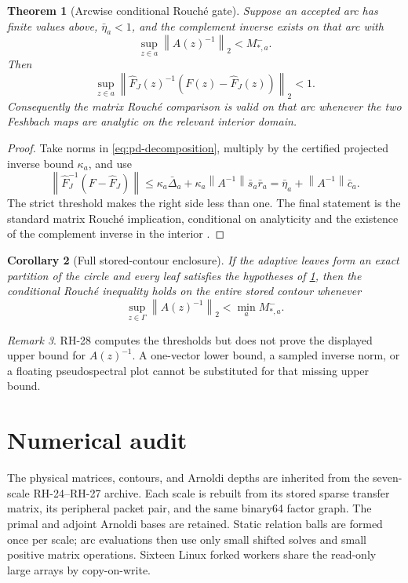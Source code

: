 \documentclass[11pt]{article}
\newtheorem{theorem}{Theorem}[section]
\newtheorem{corollary}[theorem]{Corollary}
\theoremstyle{definition}
\theoremstyle{remark}
\newtheorem{remark}[theorem]{Remark}
\newcommand{\norm}[1]{\left\lVert#1\right\rVert}
\begin{document}
\begin{theorem}[Arcwise conditional Rouché gate]
\label{thm:arc-gate}
Suppose an accepted arc has finite values above, $\bar\eta_a<1$, and the
complement inverse exists on that arc with
\[
 \sup_{z\in a}\norm{A(z)^{-1}}_2<M_{*,a}^-.
\]
Then
\[
 \sup_{z\in a}
 \norm{\widehat F_J(z)^{-1}(F(z)-\widehat F_J(z))}_2<1.
\]
Consequently the matrix Rouché comparison is valid on that arc whenever the
two Feshbach maps are analytic on the relevant interior domain.
\end{theorem}

\begin{proof}
Take norms in \cref{eq:pd-decomposition}, multiply by the certified
projected inverse bound $\kappa_a$, and use
\[
 \norm{\widehat F_J^{-1}(F-\widehat F_J)}
 \leq\kappa_a\bar\Delta_a+
 \kappa_a\norm{A^{-1}}\bar s_a\bar r_a
 =\bar\eta_a+\norm{A^{-1}}\bar c_a.
\]
The strict threshold makes the right side less than one.  The final
statement is the standard matrix Rouché implication, conditional on
analyticity and the existence of the complement inverse in the interior
\citep{GohbergSigal1971}.
\end{proof}

\begin{corollary}[Full stored-contour enclosure]
If the adaptive leaves form an exact partition of the circle and every leaf
satisfies the hypotheses of \cref{thm:arc-gate}, then the conditional
Rouché inequality holds on the entire stored contour whenever
\[
 \sup_{z\in\Gamma}\norm{A(z)^{-1}}_2<\min_a M_{*,a}^-.
\]
\end{corollary}

\begin{remark}
RH-28 computes the thresholds but does not prove the displayed upper bound
for $A(z)^{-1}$.  A one-vector lower bound, a sampled inverse norm, or a
floating pseudospectral plot cannot be substituted for that missing upper
bound.
\end{remark}


\section{Numerical audit}
\label{sec:numerics}

The physical matrices, contours, and Arnoldi depths are inherited from the
seven-scale RH-24--RH-27 archive.  Each scale is rebuilt from its stored
sparse transfer matrix, its peripheral packet pair, and the same binary64
factor graph.  The primal and adjoint Arnoldi bases are retained.  Static
relation balls are formed once per scale; arc evaluations then use only
small shifted solves and small positive matrix operations.  Sixteen Linux
forked workers share the read-only large arrays by copy-on-write.
\end{document}
